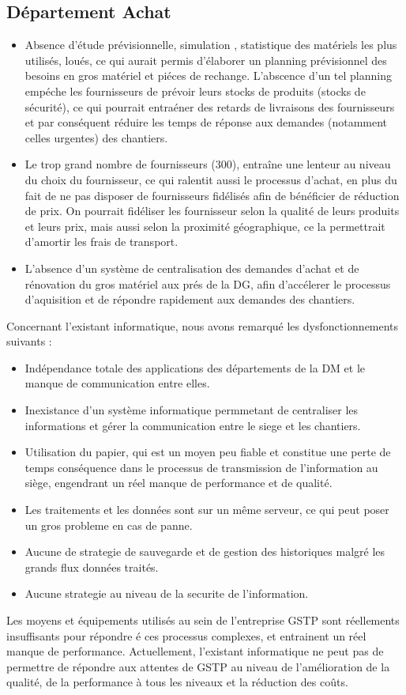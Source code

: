 		\subsection{Département Achat}
				\begin{itemize}
				    \item Absence d'étude prévisionnelle, simulation , statistique des matériels les plus utilisés, loués, ce qui aurait permis d'élaborer un planning prévisionnel des besoins en gros matériel et piéces de rechange. L'abscence d'un tel planning empéche les fournisseurs de prévoir leurs stocks de produits (stocks de sécurité), ce qui pourrait entraéner des retards de livraisons des fournisseurs et par conséquent réduire les temps de réponse aux demandes (notamment celles urgentes) des chantiers.
						\item Le trop grand nombre de fournisseurs (300), entra\^ine une lenteur au niveau du choix du fournisseur, ce qui ralentit aussi le processus d'achat, en plus du fait de ne pas disposer de fournisseurs fidélisés afin de bénéficier de réduction de prix. On pourrait fidéliser les fournisseur selon la qualité de leurs produits et leurs prix, mais aussi selon la proximité géographique, ce la permettrait d'amortir les frais de transport.
						\item L'absence d'un système de centralisation des demandes d'achat et de rénovation du gros matériel aux prés de la DG, afin d'accélerer le processus d'aquisition et de répondre rapidement aux demandes des chantiers.
				\end{itemize}
		
		Concernant l'existant informatique, nous avons remarqué les dysfonctionnements suivants :
		\begin{itemize}
				\item Indépendance totale des applications des départements de la DM et le manque de communication entre elles.
				\item Inexistance d'un système informatique permmetant de centraliser les informations et gérer la communication entre le siege et les chantiers.
				\item Utilisation du papier, qui est un moyen peu fiable et constitue une perte de temps conséquence dans le processus de transmission de l'information au siège, engendrant un réel manque de performance et de qualité.
				\item Les traitements et les données sont sur un même serveur, ce qui peut poser un gros probleme en cas de panne.
				\item Aucune de strategie de sauvegarde et de gestion des historiques malgré les grands flux données traités.
				\item Aucune strategie au niveau de la securite de l'information.
		\end{itemize}

		Les moyens et équipements utilisés au sein de l'entreprise GSTP sont réellements insuffisants pour répondre é ces processus complexes, et entrainent un réel manque de performance. Actuellement, l'existant informatique ne peut pas de permettre de répondre aux attentes de
GSTP au niveau de l'amélioration de la qualité, de la performance à tous les niveaux et la réduction des coûts.

